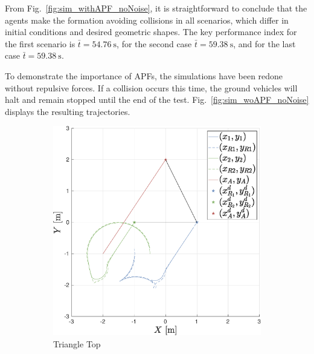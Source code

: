 \documentclass{ifacconf}
\begin{document}
From Fig.~\ref{fig:sim_withAPF_noNoise}, it is straightforward to conclude that the agents make the formation avoiding collisions in 
all scenarios, which differ in initial conditions and desired geometric shapes.
The key performance index for the first scenario is $\bar{t} = \SI{54.76}{\second}$,
for the second case $\bar{t} = \SI{59.38}{\second}$, and for 
the last case $\bar{t} = \SI{59.38}{\second}$.

To demonstrate the importance of APFs, the simulations have been redone without repulsive
forces.
If a collision occurs this time, the ground vehicles will halt and remain stopped until 
the end of the test.
Fig.~\ref{fig:sim_woAPF_noNoise} displays the resulting trajectories.
\begin{figure}
    \centering
    \begin{subfigure}[b]{0.32\columnwidth}
        \centering
        \includegraphics[width=\linewidth]{images/simulations/wo_APF/1st_scenario_wo.eps}
        \caption{Triangle Top}
        \label{fig:sim_woAPF_noNoise_1}
    \end{subfigure}
    \begin{subfigure}[b]{0.32\columnwidth}
        \centering

\end{subfigure}
\end{figure}
\end{document}

